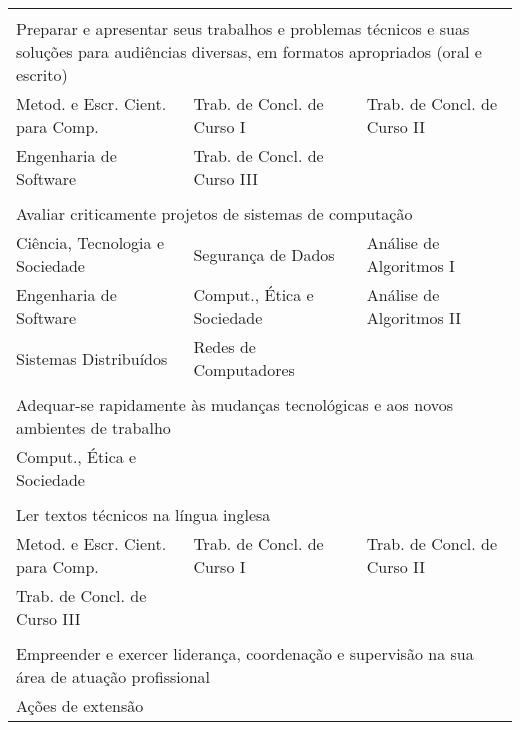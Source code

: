 \begin{longtable}{|p{}p{}p{}|}
    \multicolumn{3}{p{0.95\textwidth}}{}\\
    \multicolumn{3}{p{0.95\textwidth}}{Preparar e apresentar seus trabalhos e
    problemas técnicos e suas soluções para audiências diversas, em formatos
    apropriados (oral e escrito)}\\
    \hline
    \textcolor{nblue}{\small Metod. e Escr. Cient. para Comp.} &
    \textcolor{nblue}{Trab. de Concl. de Curso I} &
    \textcolor{nblue}{Trab. de Concl. de Curso II}\\
    \textcolor{nblue}{Engenharia de Software} &
    \textcolor{nblue}{Trab. de Concl. de Curso III} & \\
    \hline
    
    \multicolumn{3}{p{0.95\textwidth}}{}\\
    \multicolumn{3}{p{0.95\textwidth}}{Avaliar criticamente projetos de sistemas de computação}\\
    \hline
    \textcolor{nred}{Ciência, Tecnologia e Sociedade} &
    \textcolor{nblue}{Segurança de Dados} &
    \textcolor{nblue}{Análise de Algoritmos I} \\
    \textcolor{nblue}{Engenharia de Software} &
    \textcolor{nblue}{Comput., Ética e Sociedade} &
    \textcolor{nblue}{Análise de Algoritmos II} \\
    \textcolor{nblue}{Sistemas Distribuídos} & 
    \textcolor{nblue}{Redes de Computadores} & \\
    \hline
    
    \multicolumn{3}{p{0.95\textwidth}}{}\\
    \multicolumn{3}{p{0.95\textwidth}}{Adequar-se rapidamente às mudanças
    tecnológicas e aos novos ambientes de trabalho}\\
    \hline
    \textcolor{nblue}{Comput., Ética e Sociedade} & & \\
    \hline
    
    \multicolumn{3}{p{0.95\textwidth}}{}\\
    \multicolumn{3}{p{0.95\textwidth}}{Ler textos técnicos na língua inglesa}\\
    \hline
    \textcolor{nblue}{\small Metod. e Escr. Cient. para Comp.} &
    \textcolor{nblue}{Trab. de Concl. de Curso I} &
    \textcolor{nblue}{Trab. de Concl. de Curso II} \\
    \textcolor{nblue}{Trab. de Concl. de Curso III} & & \\
    \hline
    
    \multicolumn{3}{p{0.95\textwidth}}{}\\
    \multicolumn{3}{p{0.95\textwidth}}{Empreender e exercer liderança, coordenação
    e supervisão na sua área de atuação profissional}\\
    \hline
    \textcolor{npurple}{Ações de extensão} && \\
    \hline
    

\end{longtable}
